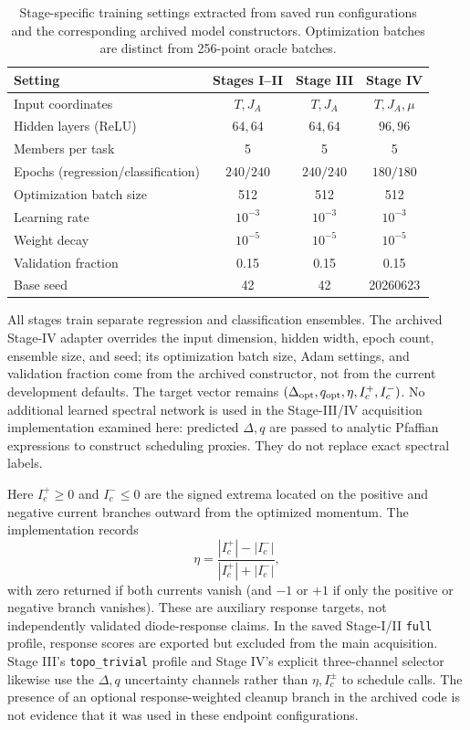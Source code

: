 \begin{table}[tb]\centering\setlength{\tabcolsep}{5pt}
\caption{Stage-specific training settings extracted from saved run configurations and the corresponding archived model constructors. Optimization batches are distinct from 256-point oracle batches.}\label{tab:networks}
\begin{tabular}{lccc}\toprule Setting & Stages I--II & Stage III & Stage IV\\\midrule
Input coordinates & $T,J_A$ & $T,J_A$ & $T,J_A,\mu$\\
Hidden layers (ReLU) & $64,64$ & $64,64$ & $96,96$\\
Members per task & 5 & 5 & 5\\
Epochs (regression/classification) & $240/240$ & $240/240$ & $180/180$\\
Optimization batch size & 512 & 512 & 512\\
Learning rate & $10^{-3}$ & $10^{-3}$ & $10^{-3}$\\
Weight decay & $10^{-5}$ & $10^{-5}$ & $10^{-5}$\\
Validation fraction & 0.15 & 0.15 & 0.15\\
Base seed & 42 & 42 & 20260623\\\bottomrule
\end{tabular}\end{table}
All stages train separate regression and classification ensembles. The archived Stage-IV adapter overrides the input dimension, hidden width, epoch count, ensemble size, and seed; its optimization batch size, Adam settings, and validation fraction come from the archived constructor, not from the current development defaults. The target vector remains $(\Delta_{\rm opt},q_{\rm opt},\eta,I_c^+,I_c^-)$. No additional learned spectral network is used in the Stage-III/IV acquisition implementation examined here: predicted $\Delta,q$ are passed to analytic Pfaffian expressions to construct scheduling proxies. They do not replace exact spectral labels.

Here $I_c^+\geq0$ and $I_c^-\leq0$ are the signed extrema located on the positive and negative current branches outward from the optimized momentum. The implementation records
\begin{equation}\eta=\frac{|I_c^+|-|I_c^-|}{|I_c^+|+|I_c^-|},\label{eq:eta}\end{equation}
with zero returned if both currents vanish (and $-1$ or $+1$ if only the positive or negative branch vanishes). These are auxiliary response targets, not independently validated diode-response claims. In the saved Stage-I/II \texttt{full} profile, response scores are exported but excluded from the main acquisition. Stage III's \texttt{topo\_trivial} profile and Stage IV's explicit three-channel selector likewise use the $\Delta,q$ uncertainty channels rather than $\eta,I_c^\pm$ to schedule calls. The presence of an optional response-weighted cleanup branch in the archived code is not evidence that it was used in these endpoint configurations.

